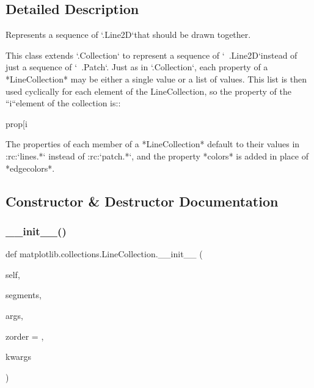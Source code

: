 \subsection{Detailed Description}
\begin{DoxyVerb}Represents a sequence of `.Line2D`\s that should be drawn together.

This class extends `.Collection` to represent a sequence of
`~.Line2D`\s instead of just a sequence of `~.Patch`\s.
Just as in `.Collection`, each property of a *LineCollection* may be either
a single value or a list of values. This list is then used cyclically for
each element of the LineCollection, so the property of the ``i``\th element
of the collection is::

  prop[i %

The properties of each member of a *LineCollection* default to their values
in :rc:`lines.*` instead of :rc:`patch.*`, and the property *colors* is
added in place of *edgecolors*.
\end{DoxyVerb}
 

\subsection{Constructor \& Destructor Documentation}
\mbox{\label{classmatplotlib_1_1collections_1_1LineCollection_aa3be8ca273aa64fa046cc23229162431}} 
\subsubsection{\texorpdfstring{\+\_\+\+\_\+init\+\_\+\+\_\+()}{\_\_init\_\_()}}
{\footnotesize\ttfamily def matplotlib.\+collections.\+Line\+Collection.\+\_\+\+\_\+init\+\_\+\+\_\+ (\begin{DoxyParamCaption}\item[{}]{self,  }\item[{}]{segments,  }\item[{}]{args,  }\item[{}]{zorder = {},  }\item[{}]{kwargs }\end{DoxyParamCaption})}

